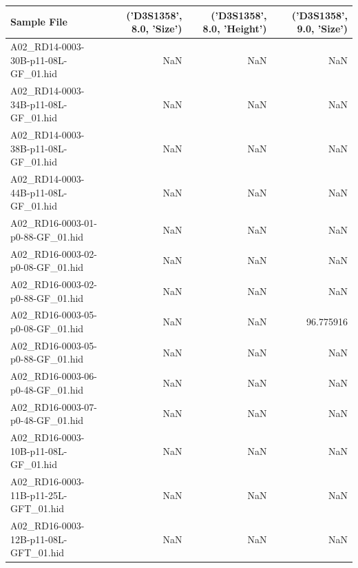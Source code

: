\begin{landscape}
\begin{table}[htbp]
\centering
\begin{tabular}{lrrr}
\toprule
                         Sample File &  ('D3S1358', 8.0, 'Size') &  ('D3S1358', 8.0, 'Height') &  ('D3S1358', 9.0, 'Size') \\
\midrule
 A02\_RD14-0003-30B-p11-08L-GF\_01.hid &                       NaN &                         NaN &                       NaN \\
 A02\_RD14-0003-34B-p11-08L-GF\_01.hid &                       NaN &                         NaN &                       NaN \\
 A02\_RD14-0003-38B-p11-08L-GF\_01.hid &                       NaN &                         NaN &                       NaN \\
 A02\_RD14-0003-44B-p11-08L-GF\_01.hid &                       NaN &                         NaN &                       NaN \\
    A02\_RD16-0003-01-p0-88-GF\_01.hid &                       NaN &                         NaN &                       NaN \\
    A02\_RD16-0003-02-p0-08-GF\_01.hid &                       NaN &                         NaN &                       NaN \\
    A02\_RD16-0003-02-p0-88-GF\_01.hid &                       NaN &                         NaN &                       NaN \\
    A02\_RD16-0003-05-p0-08-GF\_01.hid &                       NaN &                         NaN &                 96.775916 \\
    A02\_RD16-0003-05-p0-88-GF\_01.hid &                       NaN &                         NaN &                       NaN \\
    A02\_RD16-0003-06-p0-48-GF\_01.hid &                       NaN &                         NaN &                       NaN \\
    A02\_RD16-0003-07-p0-48-GF\_01.hid &                       NaN &                         NaN &                       NaN \\
 A02\_RD16-0003-10B-p11-08L-GF\_01.hid &                       NaN &                         NaN &                       NaN \\
A02\_RD16-0003-11B-p11-25L-GFT\_01.hid &                       NaN &                         NaN &                       NaN \\
A02\_RD16-0003-12B-p11-08L-GFT\_01.hid &                       NaN &                         NaN &                       NaN \\

\end{tabular}
\end{table}
\end{landscape}
